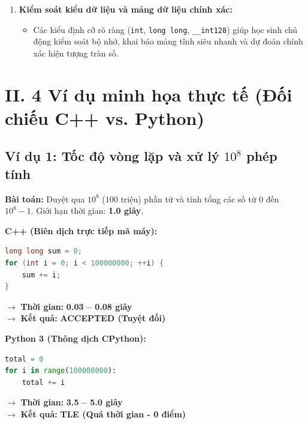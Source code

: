\documentclass[11pt,a4paper]{article}
\begin{document}
\begin{enumerate}
    \item \textbf{Kiểm soát kiểu dữ liệu và mảng dữ liệu chính xác:}
    \begin{itemize}
        \item Các kiểu định cỡ rõ ràng (\texttt{int}, \texttt{long long}, \texttt{\_\_int128}) giúp học sinh chủ động kiểm soát bộ nhớ, khai báo mảng tĩnh siêu nhanh và dự đoán chính xác hiện tượng tràn số.
    \end{itemize}
\end{enumerate}

\newpage

\section*{\color{AsianDarkBlue}\large II. 4 Ví dụ minh họa thực tế (Đối chiếu C++ vs. Python)}

\subsection*{\color{AsianBlue}\normalsize Ví dụ 1: Tốc độ vòng lặp và xử lý $10^8$ phép tính}
\textbf{Bài toán:} Duyệt qua $10^8$ ($100$ triệu) phần tử và tính tổng các số từ $0$ đến $10^8 - 1$. Giới hạn thời gian: \textbf{1.0 giây}.

\noindent
\begin{minipage}[t]{0.48\textwidth}
\textbf{\color{AsianDarkBlue}C++ (Biên dịch trực tiếp mã máy):}
\begin{lstlisting}[style=codeC,language=C++]
long long sum = 0;
for (int i = 0; i < 100000000; ++i) {
    sum += i;
}
\end{lstlisting}
$\to$ \textbf{Thời gian:} \textbf{0.03 -- 0.08 giây}\\
$\to$ \textbf{Kết quả:} \textbf{\color{green!70!black}ACCEPTED (Tuyệt đối)}
\end{minipage}
\hfill
\begin{minipage}[t]{0.48\textwidth}
\textbf{\color{orange!80!black}Python 3 (Thông dịch CPython):}
\begin{lstlisting}[style=codePy,language=Python]
total = 0
for i in range(100000000):
    total += i
\end{lstlisting}
$\to$ \textbf{Thời gian:} \textbf{3.5 -- 5.0 giây}\\
$\to$ \textbf{Kết quả:} \textbf{\color{red!80!black}TLE (Quá thời gian - 0 điểm)}
\end{minipage}

\vspace{0.25cm}
\end{document}
